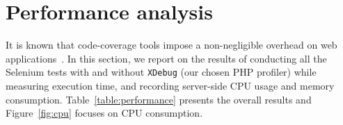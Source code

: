 \begin{table}[]
  \centering
  \caption{Verifying exploitability of vulnerabilities by testing exploits against original \& debloated web applications}
  \label{table:metasploit_vulns}
\end{table}

\section{Performance analysis}
\label{subsection:performance}
It is known that code-coverage tools impose a non-negligible overhead on web applications~\cite{xdebug-performance1}. In this section, we report on the results of conducting all the Selenium tests with and without \texttt{XDebug} (our chosen PHP profiler) while measuring execution time, and recording server-side CPU usage and memory consumption. Table~\ref{table:performance} presents the overall results and Figure~\ref{fig:cpu} focuses on CPU consumption.

